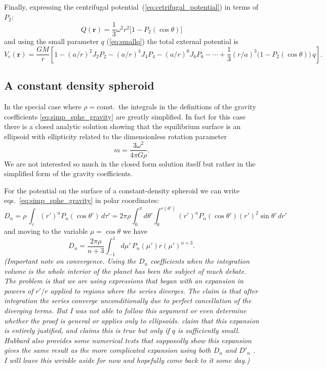 \documentclass[amsmath,amsfonts,rmp,letterpaper]{revtex4}
\newcommand{\V}[1]{\mathbf{#1}} %
\newcommand{\arr}{\V{r}}
\newcommand{\om}{\omega}
\newcommand{\const}{\mathrm{const.}}
\begin{document}
Finally, expressing the centrifugal potential~(\ref{eq:cetrifugal_potential}) in
terms of $P_2$:
\begin{equation}
Q(\arr) = \frac{1}{3}\omega^2r^2\bigl[1 - P_2(\cos\theta)\bigr]
\end{equation}
and using the small parameter $q$ (\ref{eq:smallq}) the total external potential
is
\begin{equation}\label{eq:total_external_potential}
V_e(\arr) = \frac{GM}{r}\left[1 - (a/r)^2J_2P_2 - (a/r)^4J_4P_4 -
(a/r)^6J_6P_6 - \cdots + \frac{1}{3}(r/a)^3\bigl(1 - 
P_2(\cos\theta)\bigr)\,q\right].
\end{equation}


\subsection{A constant density spheroid} %
\label{sec:a_constant_density_spheroid}
In the special case where $\rho=\const$~the integrals in the definitions of the
gravity coefficients \eqref{eq:simp_sphe_gravity} are greatly simplified. In fact
for this case there is a closed analytic solution showing that the equilibrium
surface is an ellipsoid with ellipticity related to the dimensionless rotation
parameter
\begin{equation}
m = \frac{3\om^2}{4\pi{G}\rho}.
\end{equation}
We are not interested so much in the closed form solution itself but rather in
the simplified form of the gravity coefficients.

For the potential on the surface of a constant-density spheroid we
can write eqs.~\eqref{eq:simp_sphe_gravity} in polar coordinates:
\begin{equation}\label{eq:polar_integral}
D_n = \rho\,\int_\tau (r')^nP_n(\cos\theta')\,d\tau' =
2\pi\rho\int_{0}^{\pi}d\theta'\int_{0}^{r(\theta')}(r')^nP_n(\cos\theta')
(r')^2\sin\theta'\,dr'
\end{equation}
and moving to the variable $\mu=\cos\theta$ we have
\begin{equation}
D_n = \frac{2\pi\rho}{n + 3}\int_{-1}^{1}d\mu'\,P_n(\mu')r(\mu')^{n + 3}.
\end{equation}
\emph{(Important note on convergence. Using the $D_n$ coefficients when the
integration
volume is the whole interior of the planet has been the subject of much debate.
The problem is that we are using expressions that began with an expansion in
powers of $r'/r$ applied to regions where the series diverges. The claim is that
after integration the series converge unconditionally due to perfect cancellation
of the diverging terms. But I was not able to follow this argument or even
determine whether the proof is general or applies only to ellipsoids.
\citet{Zharkov1978} claim that this expansion is entirely justified, and
\citet{Hubbard2014} claims this is true but only if $q$ is sufficiently small.
Hubbard also provides some numerical tests that supposedly show this expansion
gives the same result as the more complicated expansion using both $D_n$ and
$D'_n$ \citep[e.g.][]{Kong2013}. I will leave this wrinkle aside for now and
hopefully come back to it some day.)}
\end{document}
